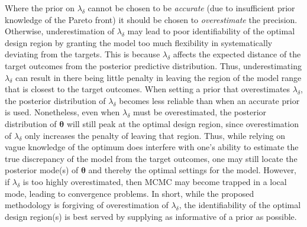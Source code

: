 \documentclass[12pt]{article}
\begin{document}
Where the prior on $\lambda_\delta$ cannot be chosen to be \emph{accurate} (due to insufficient prior knowledge of the Pareto front) it should be chosen to \emph{overestimate} the precision.
%
Otherwise, underestimation of $\lambda_\delta$ may lead to poor identifiability of the optimal design region by granting the model too much flexibility in systematically deviating from the targets.
%
This is because $\lambda_\delta$ affects the expected distance of the target outcomes from the posterior predictive distribution.
%
Thus, underestimating $\lambda_\delta$ can result in there being little penalty in leaving the region of the model range that is closest to the target outcomes.
%
When setting a prior that overestimates $\lambda_\delta$, the posterior distribution of $\lambda_\delta$ becomes less reliable than when an accurate prior is used.
%
Nonetheless, even when $\lambda_\delta$ must be overestimated, the posterior distribution of $\boldsymbol \theta$ will still peak at the optimal design region, since overestimation of $\lambda_\delta$ only increases the penalty of leaving that region.
%
Thus, while relying on vague knowledge of the optimum does interfere with one's ability to estimate the true discrepancy of the model from the target outcomes, one may still locate the posterior mode(s) of $\boldsymbol \theta$ and thereby the optimal settings for the model.
However, if $\lambda_\delta$ is too highly overestimated, then MCMC may become trapped in a local mode, leading to convergence problems. 
%
In short, while the proposed methodology is forgiving of overestimation of $\lambda_\delta$, the identifiability of the optimal design region(s) is best served by supplying as informative of a prior as possible. 
\end{document}
